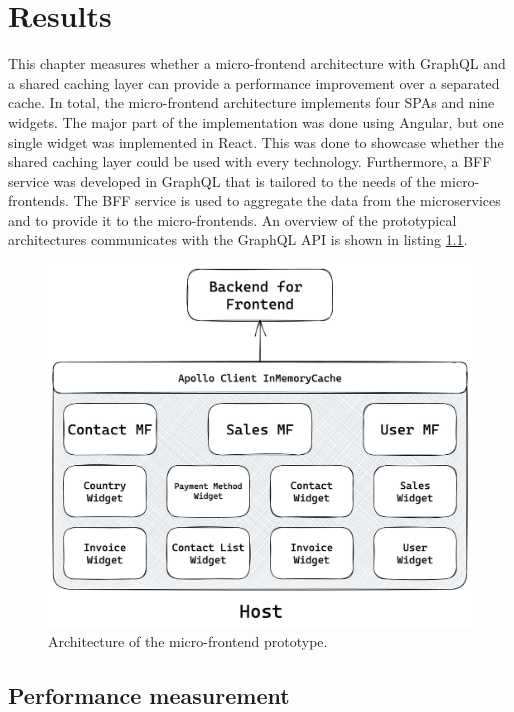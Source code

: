 \chapter{Results}\label{chapter:results}

This chapter measures whether a micro-frontend architecture with GraphQL and a shared caching layer can provide a performance improvement over a separated cache. In total, the micro-frontend architecture implements four \acp{SPA} and nine widgets. The major part of the implementation was done using Angular, but one single widget was implemented in React. This was done to showcase whether the shared caching layer could be used with every technology. Furthermore, a \ac{BFF} service was developed in GraphQL that is tailored to the needs of the micro-frontends. The \ac{BFF} service is used to aggregate the data from the microservices and to provide it to the micro-frontends. An overview of the prototypical architectures communicates with the GraphQL \ac{API} is shown in listing \ref{fig:results:micro-frontend-prototype}.

\ifshowImages
\begin{figure}[H]
  \centering
  \includegraphics[width=0.8\linewidth]{images/results/micro-frontend-prototype.png}
  \caption{Architecture of the micro-frontend prototype.}\label{fig:results:micro-frontend-prototype}
\end{figure}
\fi

\section{Performance measurement}\label{section:results:performance-measurement}

